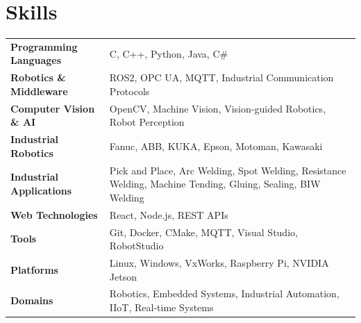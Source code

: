 \documentclass[a4paper,12pt]{article}
\newcommand{\cvspacing}{3pt}
\newcommand{\skill}[2]{#1 & #2 \\[\cvspacing]}
\begin{document}
\section{Skills}

\begin{tabularx}{\linewidth}{@{}>{\bfseries}l X@{}}

\skill{Programming Languages}
{C, C++, Python, Java, C\#}

\skill{Robotics \& Middleware}
{ROS2, OPC UA, MQTT, Industrial Communication Protocols}

\skill{Computer Vision \& AI}
{OpenCV, Machine Vision, Vision-guided Robotics, Robot Perception}

\skill{Industrial Robotics}
{Fanuc, ABB, KUKA, Epson, Motoman, Kawasaki}

\skill{Industrial Applications}
{Pick and Place, Arc Welding, Spot Welding, Resistance Welding, Machine Tending, Gluing, Sealing, BIW Welding}

\skill{Web Technologies}
{React, Node.js, REST APIs}

\skill{Tools}
{Git, Docker, CMake, MQTT, Visual Studio, RobotStudio}

\skill{Platforms}
{Linux, Windows, VxWorks, Raspberry Pi, NVIDIA Jetson}

\skill{Domains}
{Robotics, Embedded Systems, Industrial Automation, IIoT, Real-time Systems}


\end{tabularx}

\end{document}
